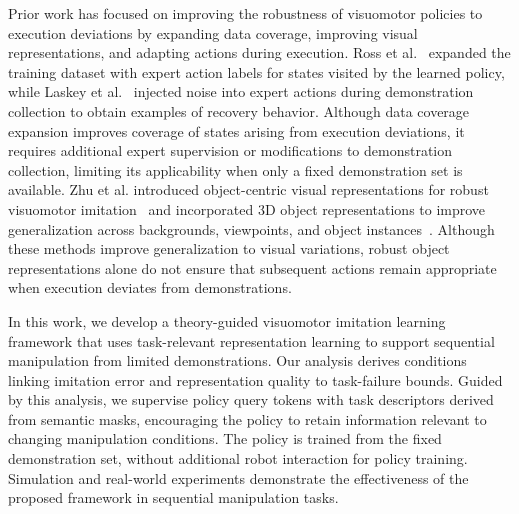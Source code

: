 Prior work has focused on improving the robustness of visuomotor policies
to execution deviations by expanding data coverage, improving visual
representations, and adapting actions during execution.
Ross et al.~\cite{ross2011} expanded the training dataset with expert
action labels for states visited by the learned policy, while
Laskey et al.~\cite{laskey2017dart} injected noise into expert actions
during demonstration collection to obtain examples of recovery behavior.
Although data coverage expansion improves coverage of states arising
from execution deviations, it requires additional expert supervision
or modifications to demonstration collection, limiting its applicability
when only a fixed demonstration set is available.
Zhu et al. introduced object-centric visual representations
for robust visuomotor imitation~\cite{zhu2023viola} and incorporated
3D object representations to improve generalization across
backgrounds, viewpoints, and object instances~\cite{zhu2023groot}.
Although these methods improve generalization to visual variations,
robust object representations alone do not ensure that subsequent
actions remain appropriate when execution deviates from demonstrations.

In this work, we develop a theory-guided visuomotor imitation learning
framework that uses task-relevant representation learning to support sequential manipulation
from limited demonstrations.
Our analysis derives conditions linking imitation error and
representation quality to task-failure bounds.
Guided by this analysis, we supervise policy query tokens with task descriptors derived from semantic masks,
encouraging the policy to retain information relevant to changing manipulation conditions.
The policy is trained from the fixed demonstration set, without additional robot interaction
for policy training.
Simulation and real-world experiments demonstrate the effectiveness
of the proposed framework in sequential manipulation tasks.


